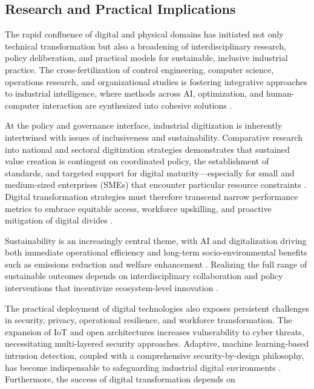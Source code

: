 \documentclass[sigconf]{acmart}
\begin{document}
\subsection{Research and Practical Implications}

The rapid confluence of digital and physical domains has initiated not only technical transformation but also a broadening of interdisciplinary research, policy deliberation, and practical models for sustainable, inclusive industrial practice. The cross-fertilization of control engineering, computer science, operations research, and organizational studies is fostering integrative approaches to industrial intelligence, where methods across AI, optimization, and human-computer interaction are synthesized into cohesive solutions \cite{ref41}\cite{ref86}.

At the policy and governance interface, industrial digitization is inherently intertwined with issues of inclusiveness and sustainability. Comparative research into national and sectoral digitization strategies demonstrates that sustained value creation is contingent on coordinated policy, the establishment of standards, and targeted support for digital maturity—especially for small and medium-sized enterprises (SMEs) that encounter particular resource constraints \cite{ref21}\cite{ref23}. Digital transformation strategies must therefore transcend narrow performance metrics to embrace equitable access, workforce upskilling, and proactive mitigation of digital divides \cite{ref91}.

Sustainability is an increasingly central theme, with AI and digitalization driving both immediate operational efficiency and long-term socio-environmental benefits such as emissions reduction and welfare enhancement \cite{ref90}. Realizing the full range of sustainable outcomes depends on interdisciplinary collaboration and policy interventions that incentivize ecosystem-level innovation \cite{ref88}.

The practical deployment of digital technologies also exposes persistent challenges in security, privacy, operational resilience, and workforce transformation. The expansion of IoT and open architectures increases vulnerability to cyber threats, necessitating multi-layered security approaches. Adaptive, machine learning-based intrusion detection, coupled with a comprehensive security-by-design philosophy, has become indispensable to safeguarding industrial digital environments \cite{ref10}\cite{ref92}. Furthermore, the success of digital transformation depends on
\end{document}
